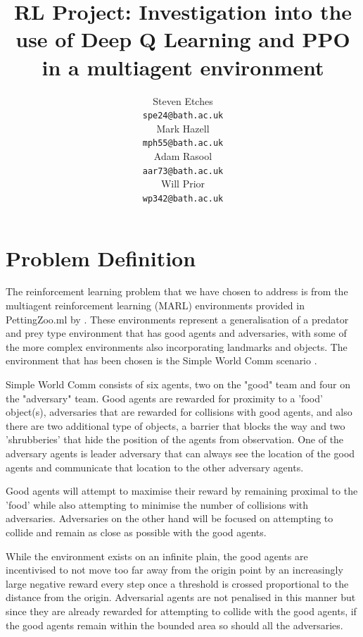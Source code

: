 \documentclass{article}
\title{RL Project: Investigation into the use of Deep Q Learning and PPO in a multiagent environment}
\author{
  Steven Etches \\
  \texttt{spe24@bath.ac.uk} \\
  \And
  Mark Hazell \\
  \texttt{mph55@bath.ac.uk} \\
  \And
  Adam Rasool \\
  \texttt{aar73@bath.ac.uk} \\
  \And
  Will Prior \\
  \texttt{wp342@bath.ac.uk}
}
\begin{document}
\maketitle

\section{Problem Definition} \label{Problem Definition}

The reinforcement learning problem that we have chosen to address is from the multiagent reinforcement learning (MARL) environments provided in PettingZoo.ml by \citet{terry2020pettingzoo}.
These environments represent a generalisation of a predator and prey type environment that has good agents and adversaries, with some of the more complex environments also incorporating landmarks and objects.
The environment that has been chosen is the Simple World Comm scenario \citet{mordatch2017emergence}.

Simple World Comm consists of six agents, two on the "good" team and four on the "adversary" team.
Good agents are rewarded for proximity to a 'food' object(s), adversaries that are rewarded for collisions with good agents, and also there are two additional type of objects, a barrier that blocks the way and two 'shrubberies' that hide the position of the agents from observation.
One of the adversary agents is leader adversary that can always see the location of the good agents and communicate that location to the other adversary agents.

Good agents will attempt to maximise their reward by remaining proximal to the 'food' while also attempting to minimise the number of collisions with adversaries.
Adversaries on the other hand will be focused on attempting to collide and remain as close as possible with the good agents.

While the environment exists on an infinite plain, the good agents are incentivised to not move too far away from the origin point by an increasingly large negative reward every step once a threshold is crossed proportional to the distance from the origin.
Adversarial agents are not penalised in this manner but since they are already rewarded for attempting to collide with the good agents, if the good agents remain within the bounded area so should all the adversaries.
\end{document}

